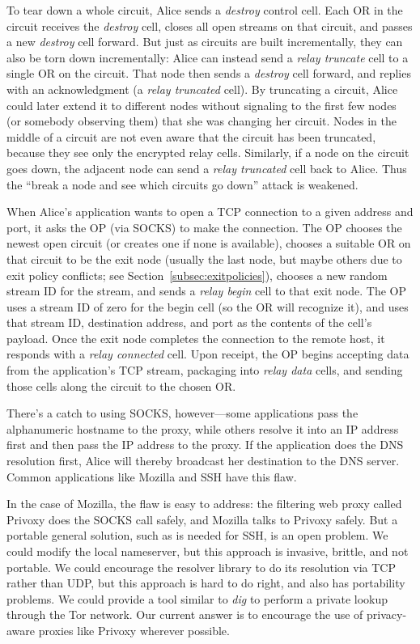 \documentclass[times,10pt,twocolumn]{article}
\begin{document}
To tear down a whole circuit, Alice sends a \emph{destroy} control
cell. Each OR in the circuit receives the \emph{destroy} cell, closes
all open streams on that circuit, and passes a new \emph{destroy} cell
forward. But just as circuits are built incrementally, they can also
be torn down incrementally: Alice can instead send a \emph{relay
truncate} cell to a single OR on the circuit. That node then sends a
\emph{destroy} cell forward, and replies with an acknowledgment (a
\emph{relay truncated} cell).  By truncating a circuit, Alice could
later extend it to different nodes without signaling to the first few
nodes (or somebody observing them) that she was changing her
circuit. Nodes in the middle of a circuit are not even aware that the
circuit has been truncated, because they see only the encrypted relay
cells.  Similarly, if a node on the circuit goes down, the adjacent
node can send a \emph{relay truncated} cell back to Alice.  Thus the
``break a node and see which circuits go down'' attack is weakened.

\label{subsec:tcp}

When Alice's application wants to open a TCP connection to a given
address and port, it asks the OP (via SOCKS) to make the
connection. The OP chooses the newest open circuit (or creates one if
none is available), chooses a suitable OR on that circuit to be the
exit node (usually the last node, but maybe others due to exit policy
conflicts; see Section~\ref{subsec:exitpolicies}), chooses a new
random stream ID for the stream, and sends a \emph{relay begin} cell
to that exit node.  The OP uses a stream ID of zero for the begin cell
(so the OR will recognize it), and uses that stream ID, destination
address, and port as the contents of the cell's payload.  Once the
exit node completes the connection to the remote host, it responds
with a \emph{relay connected} cell.  Upon receipt, the OP begins
accepting data from the application's TCP stream, packaging into
\emph{relay data} cells, and sending those cells along the circuit to
the chosen OR.

There's a catch to using SOCKS, however---some applications pass the
alphanumeric hostname to the proxy, while others resolve it into an IP
address first and then pass the IP address to the proxy.  If the
application does the DNS resolution first, Alice will thereby
broadcast her destination to the DNS server.  Common applications
like Mozilla and SSH have this flaw.

In the case of Mozilla, the flaw is easy to address: the filtering web
proxy called Privoxy does the SOCKS call safely, and Mozilla talks to
Privoxy safely. But a portable general solution, such as is needed for
SSH, is
an open problem. We could modify the local nameserver, but this approach
is invasive, brittle, and not portable.  We could encourage the resolver
library to do its resolution via TCP rather than UDP, but this approach is
hard to do right, and also has portability problems. We could provide a
tool similar to \emph{dig} to perform a private lookup through the
Tor network. Our current answer is to encourage the use of
privacy-aware proxies like Privoxy wherever possible.
\end{document}
